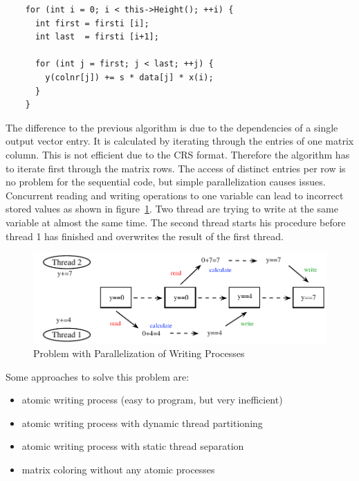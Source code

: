 \documentclass[a4paper,11pt]{scrartcl}
\begin{document}
\begin{lstlisting}
    for (int i = 0; i < this->Height(); ++i) {
      int first = firsti [i];
      int last  = firsti [i+1];

      for (int j = first; j < last; ++j) {
        y(colnr[j]) += s * data[j] * x(i);
      }
    }
\end{lstlisting}

The difference to the previous algorithm is due to the dependencies of a single
output vector entry. It is calculated by iterating through the entries
of one matrix column. This is not efficient due to the CRS format.
Therefore the algorithm has to iterate first through the matrix rows.
The access of distinct entries per row is no problem for the sequential
code, but simple parallelization causes issues.
Concurrent reading and writing operations to one variable can lead to incorrect
stored values as shown in figure~\ref{figure:parallelwriting}. Two
thread are trying to write at the same variable at almost the same time. The
second thread starts his procedure before thread 1 has finished and overwrites the
result of the first thread.

\begin{figure}[ht]
\includegraphics{graphic/parallel_writing_problem.pdf}
\caption{Problem with Parallelization of Writing Processes}
\label{figure:parallelwriting}
\end{figure}

\begin{samepage}
Some approaches to solve this problem are:
\begin{itemize}
\item atomic writing process (easy to program, but very inefficient)
\item atomic writing process with dynamic thread partitioning
\item atomic writing process with static thread separation
\item matrix coloring without any atomic processes
\end{itemize}
\end{samepage}
\end{document}
